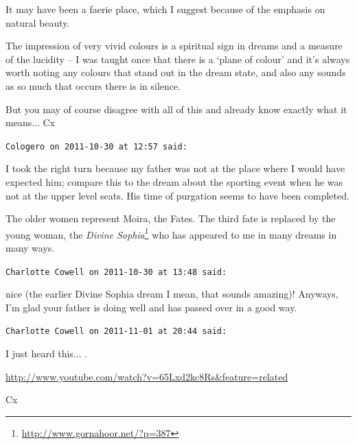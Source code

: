 \begin{footnotesize}
\begin{sffamily}
It may have been a faerie place, which I suggest because of the emphasis on natural beauty.

The impression of very vivid colours is a spiritual sign in dreams and a measure of the lucidity -- I was taught once that there is a `plane of colour' and it's always worth noting any colours that stand out in the dream state, and also any sounds as so much that occurs there is in silence.

But you may of course disagree with all of this and already know exactly what it means... Cx

\hfill

\texttt{Cologero on 2011-10-30 at 12:57 said:}

I took the right turn because my father was not at the place where I would have expected him; compare this to the dream about the sporting event when he was not at the upper level seats. His time of purgation seems to have been completed.

The older women represent Moira, the Fates. The third fate is replaced by the young woman, the \textit{Divine Sophia}\footnote{\url{http://www.gornahoor.net/?p=387}} who has appeared to me in many dreams in many ways.

\hfill

\texttt{Charlotte Cowell on 2011-10-30 at 13:48 said:}

nice (the earlier Divine Sophia dream I mean, that sounds amazing)! Anyways, I'm glad your father is doing well and has passed over in a good way.

\hfill

\texttt{Charlotte Cowell on 2011-11-01 at 20:44 said:}

I just heard this... .

\url{http://www.youtube.com/watch?v=65Lxd2kc8Rs&feature=related}


Cx

\end{sffamily}
\end{footnotesize}

